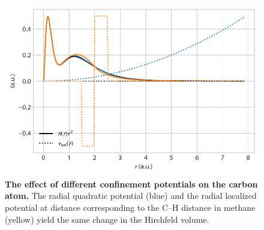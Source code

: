 \begin{figure}
\includegraphics{media/scaling-c.pdf}
\caption{\textbf{The effect of different confinement potentials on the carbon atom.}
The radial quadratic potential (blue) and the radial localized potential at distance corresponding to the C--H distance in methane (yellow) yield the same change in the Hirshfeld volume.
}\label{fig:scaling-c}
\end{figure}

